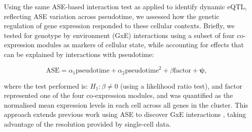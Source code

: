 Using the same ASE-based interaction test as applied to identify dynamic eQTL, reflecting ASE variation across pseudotime, we assessed how the genetic regulation of gene expression responded to these cellular contexts. 
Briefly, we tested for genotype by environment (GxE) interactions using a subset of four co-expression modules as markers of cellular state, while accounting for effects that can be explained by interactions with pseudotime:


\begin{equation}\label{eq:endodiff_ase_gxe}
    \mathrm{ASE} = \alpha_1 \mathrm{pseudotime} + \alpha_2 \mathrm{pseudotime}^2 + \beta\mathrm{factor} + \boldsymbol{\psi},
\end{equation}

where the test performed is: $H_1: \beta \neq 0$ (using a likelihood ratio test), and $\mathrm{factor}$ represented one of the four co-expression modules, 
and was quantified as the normalised mean expression levels in each cell across all genes in the cluster.
This approach extends previous work using ASE to discover GxE interactions \cite{knowles2017allele, moyerbrailean2016high}, taking advantage of the resolution provided by single-cell data. \\

